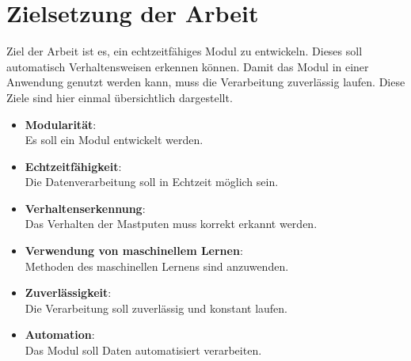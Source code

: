 \section{Zielsetzung der Arbeit} \label{sec:Zielsetzung}
Ziel der Arbeit ist es, ein echtzeitfähiges Modul zu entwickeln. Dieses soll automatisch Verhaltensweisen erkennen können. Damit das Modul in einer Anwendung genutzt werden kann, muss die Verarbeitung zuverlässig laufen. Diese Ziele sind hier einmal übersichtlich dargestellt.


\begin{itemize}
    \item \textbf{Modularität}: \\
    Es soll ein Modul entwickelt werden. 
    \item \textbf{Echtzeitfähigkeit}: \\
    Die Datenverarbeitung soll in Echtzeit möglich sein.
    \item \textbf{Verhaltenserkennung}: \\
    Das Verhalten der Mastputen muss korrekt erkannt werden.
    \item \textbf{Verwendung von maschinellem Lernen}: \\
    Methoden des maschinellen Lernens sind anzuwenden.
    \item \textbf{Zuverlässigkeit}: \\
    Die Verarbeitung soll zuverlässig und konstant laufen.
    \item \textbf{Automation}: \\
    Das Modul soll Daten automatisiert verarbeiten. 
\end{itemize}